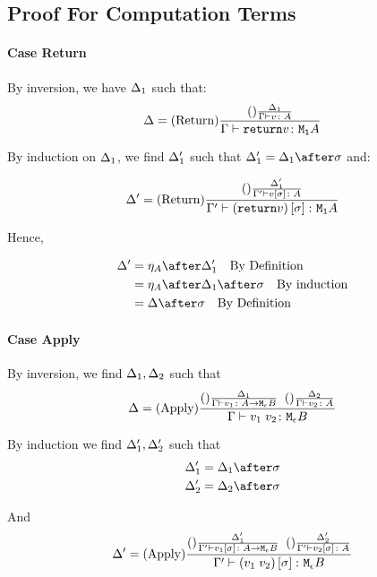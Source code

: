 {    \subsection{Proof For Computation Terms}
    \paragraph{Case Return}

    By inversion, we have $\Delta_1$ such that:
    \begin{equation}
        \Delta = (\text{Return}) \frac{(\text{}) \frac{\Delta_1}{\Gamma \vdash v \colon A}}{\Gamma \vdash \texttt{return} v \colon \texttt{M}_{\texttt{1}}{A}}
    \end{equation}

    By induction on $\Delta_1$, we find $\Delta_1'$ such that $\D_1' = \D_1\after\si$ and:

    \begin{equation}
        \Delta' = (\text{Return}) \frac{(\text{}) \frac{\Delta_1'}{\Gamma' \vdash v\left[\sigma\right] \colon A}}{\Gamma' \vdash (\texttt{return} v)\left[\sigma\right] \colon \texttt{M}_{\texttt{1}}{A}}
    \end{equation}

    Hence,

    \begin{align}
        \D' & = \point{A}\after\D_1'\qt{By Definition}\\
        & = \point{A}\after\D_1\after\si\qt{By induction}\\
        & = \D\after\si\qt{By Definition}\\
    \end{align}
    \paragraph{Case Apply}
    By inversion, we find $\Delta_1, \Delta_2$ such that
    \begin{equation}
        \Delta = (\text{Apply}) \frac{(\text{}) \frac{\Delta_1}{\Gamma \vdash v_1 \colon A \rightarrow \texttt{M}_{\epsilon}{B}}\;\;(\text{}) \frac{\Delta_2}{\Gamma \vdash v_2 \colon A}}{\Gamma \vdash v_1\; v_2 \colon \texttt{M}_{\epsilon}{B}}
    \end{equation}

    By induction we find $\Delta_1', \Delta_2'$ such that 
    \begin{align}
        \D_1' &= \D_1\after\si\\
        \D_2' &= \D_2\after\si\\
    \end{align}

    And
    \begin{equation}
        \Delta' = (\text{Apply}) \frac{(\text{}) \frac{\Delta_1'}{\Gamma' \vdash v_1\left[\sigma\right] \colon A \rightarrow \texttt{M}_{\epsilon}{B}}\;\;(\text{}) \frac{\Delta_2'}{\Gamma' \vdash v_2\left[\sigma\right] \colon A}}{\Gamma' \vdash (v_1\; v_2)\left[\sigma\right] \colon \texttt{M}_{\epsilon}{B}}
    \end{equation}

}
